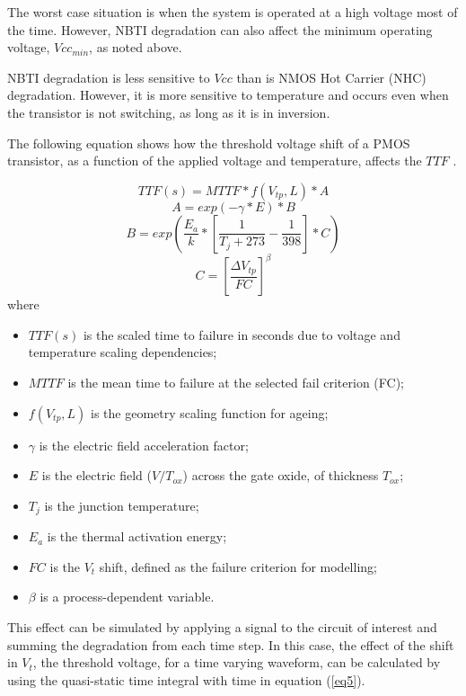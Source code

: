 \documentclass[11pt,a4paper]{article}
\begin{document}
The worst case situation is when the system is operated at a high voltage most of the time. However, NBTI degradation can also affect the minimum operating voltage, $Vcc_{min}$, as noted above.


NBTI degradation is less sensitive to $Vcc$ than is NMOS Hot Carrier (NHC) degradation. However, it is more sensitive to temperature \cite{Kimizuka} and occurs even when the transistor is not switching, as long as it is in inversion. 


The following equation shows how the threshold  voltage shift of a PMOS transistor, as a function of the applied voltage and temperature, affects the $TTF$ \cite{Jha}.

\begin{equation} 
TTF(s)=MTTF*f(V_{tp},L)*A
\label{eq1}	
\end{equation}
\begin{equation} 
A= exp(-\gamma*E)*B
\label{eq2}	
\end{equation}
\begin{equation} 
B=exp \left ( \frac {E_{a}}{k}*\left [\frac {1}{T_{j}+273}-\frac{1}{398}\right ]*C \right )
\label{eq3}	
\end{equation}
\begin{equation} 
C=\left [\frac{\Delta{V}_{tp}}{FC}\right ]^\beta
\label{eq4}	
\end{equation}
where
\begin{itemize}\item$TTF(s)$ is the scaled time to failure in seconds due to voltage and temperature scaling dependencies;
\item $MTTF$ is the mean time to failure at the selected fail criterion (FC);
\item $f(V_{tp}, L)$ is the geometry scaling function for ageing;
\item $\gamma$ is the electric field acceleration factor;
\item $E$ is the electric field  ($V/T_{ox}$) across the gate oxide, of thickness $T_{ox}$;
\item $T_ j$ is the junction temperature;
\item $E_a$ is the thermal activation energy;
\item $FC$ is the $V_t$ shift, defined as the failure criterion for modelling;
\item $\beta$ is a process-dependent variable.
\end{itemize}

This effect can be simulated by applying a signal to the circuit of interest and 
summing the degradation from each time step. 
In this case, the effect of the shift in $V_t$, the threshold voltage, for a time varying waveform, can be calculated by using the quasi-static time integral with time in equation  (\ref{eq5}).
\end{document}
